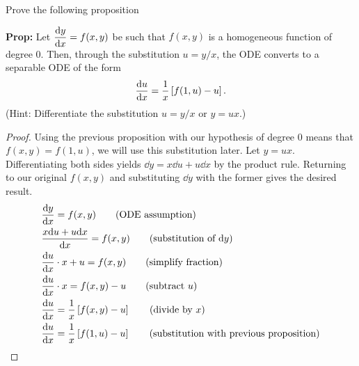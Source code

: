 Prove the following proposition

\noindent \textbf{Prop:} Let $\displaystyle \dv{y}{x} = f(x,y)$ be such that $f(x,y)$ is a homogeneous function of degree 0. Then, through the substitution $u = y/x$, the ODE converts to a separable ODE of the form $$\dv{u}{x} = \over{x} \brac{f(1,u) - u}.$$
(Hint: Differentiate the substitution $u = y/x$ or $y = ux$.)

\begin{proof}
    Using the previous proposition with our hypothesis of degree 0 means that $f(x,y) = f(1,u)$, we will use this substitution later. Let $y = ux$. Differentiating both sides yields $\dd y = x \dd u + u \dd x$ by the product rule. Returning to our original $f(x,y)$ and substituting $\dd y$ with the former gives the desired result.
    \begin{align*}
        &\dv{y}{x} = f(x,y) \tag{ODE assumption}\\
        &\frac{x \dd u + u \dd x}{ \dd x} = f(x,y) \tag{substitution of $\dd y$}\\
        &\dv{u}{x}\cdot x + u = f(x,y) \tag{simplify fraction}\\
        &\dv{u}{x}\cdot x = f(x,y) - u \tag{subtract $u$}\\
        &\dv{u}{x} = \frac{1}{x} \brac{f(x,y) - u} \tag{divide by $x$} \\
        &\dv{u}{x} = \frac{1}{x} \brac{f(1,u) - u} \tag{substitution with previous proposition}
    \end{align*}
\end{proof}